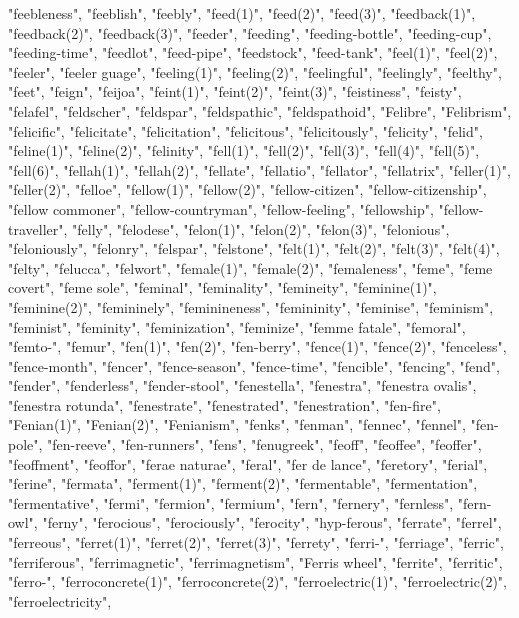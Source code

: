 "feebleness",
"feeblish",
"feebly",
"feed(1)",
"feed(2)",
"feed(3)",
"feedback(1)",
"feedback(2)",
"feedback(3)",
"feeder",
"feeding",
"feeding-bottle",
"feeding-cup",
"feeding-time",
"feedlot",
"feed-pipe",
"feedstock",
"feed-tank",
"feel(1)",
"feel(2)",
"feeler",
"feeler guage",
"feeling(1)",
"feeling(2)",
"feelingful",
"feelingly",
"feelthy",
"feet",
"feign",
"feijoa",
"feint(1)",
"feint(2)",
"feint(3)",
"feistiness",
"feisty",
"felafel",
"feldscher",
"feldspar",
"feldspathic",
"feldspathoid",
"Felibre",
"Felibrism",
"felicific",
"felicitate",
"felicitation",
"felicitous",
"felicitously",
"felicity",
"felid",
"feline(1)",
"feline(2)",
"felinity",
"fell(1)",
"fell(2)",
"fell(3)",
"fell(4)",
"fell(5)",
"fell(6)",
"fellah(1)",
"fellah(2)",
"fellate",
"fellatio",
"fellator",
"fellatrix",
"feller(1)",
"feller(2)",
"felloe",
"fellow(1)",
"fellow(2)",
"fellow-citizen",
"fellow-citizenship",
"fellow commoner",
"fellow-countryman",
"fellow-feeling",
"fellowship",
"fellow-traveller",
"felly",
"felodese",
"felon(1)",
"felon(2)",
"felon(3)",
"felonious",
"feloniously",
"felonry",
"felspar",
"felstone",
"felt(1)",
"felt(2)",
"felt(3)",
"felt(4)",
"felty",
"felucca",
"felwort",
"female(1)",
"female(2)",
"femaleness",
"feme",
"feme covert",
"feme sole",
"feminal",
"feminality",
"femineity",
"feminine(1)",
"feminine(2)",
"femininely",
"feminineness",
"femininity",
"feminise",
"feminism",
"feminist",
"feminity",
"feminization",
"feminize",
"femme fatale",
"femoral",
"femto-",
"femur",
"fen(1)",
"fen(2)",
"fen-berry",
"fence(1)",
"fence(2)",
"fenceless",
"fence-month",
"fencer",
"fence-season",
"fence-time",
"fencible",
"fencing",
"fend",
"fender",
"fenderless",
"fender-stool",
"fenestella",
"fenestra",
"fenestra ovalis",
"fenestra rotunda",
"fenestrate",
"fenestrated",
"fenestration",
"fen-fire",
"Fenian(1)",
"Fenian(2)",
"Fenianism",
"fenks",
"fenman",
"fennec",
"fennel",
"fen-pole",
"fen-reeve",
"fen-runners",
"fens",
"fenugreek",
"feoff",
"feoffee",
"feoffer",
"feoffment",
"feoffor",
"ferae naturae",
"feral",
"fer de lance",
"feretory",
"ferial",
"ferine",
"fermata",
"ferment(1)",
"ferment(2)",
"fermentable",
"fermentation",
"fermentative",
"fermi",
"fermion",
"fermium",
"fern",
"fernery",
"fernless",
"fern-owl",
"ferny",
"ferocious",
"ferociously",
"ferocity",
"hyp-ferous",
"ferrate",
"ferrel",
"ferreous",
"ferret(1)",
"ferret(2)",
"ferret(3)",
"ferrety",
"ferri-",
"ferriage",
"ferric",
"ferriferous",
"ferrimagnetic",
"ferrimagnetism",
"Ferris wheel",
"ferrite",
"ferritic",
"ferro-",
"ferroconcrete(1)",
"ferroconcrete(2)",
"ferroelectric(1)",
"ferroelectric(2)",
"ferroelectricity",
